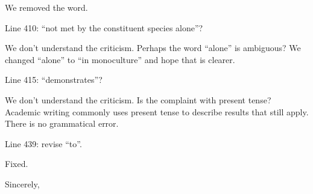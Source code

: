 \documentclass[letterpaper, 12pt]{letter}
\begin{document}
\begin{letter}{}
We removed the word.

\begin{quoting}
  Line 410: “not met by the constituent species alone”?
\end{quoting}

We don't understand the criticism. Perhaps the word ``alone'' is ambiguous? We
changed ``alone'' to ``in monoculture'' and hope that is clearer.

\begin{quoting}
  Line 415: “demonstrates”?
\end{quoting}

We don't understand the criticism. Is the complaint with present tense?
Academic writing commonly uses present tense to describe results that still
apply. There is no grammatical error.

\begin{quoting}
  Line 439: revise “to”.
\end{quoting}

Fixed.

\closing{Sincerely,}

\end{letter}
\end{document}
